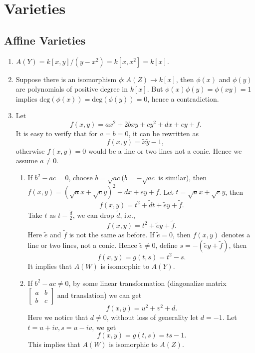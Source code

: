\chapter{Varieties}
\section{Affine Varieties}
\begin{solution}
  \begin{enumerate}
    \item $A(Y)=k[x,y]/(y-x^2)=k[x,x^2]=k[x]$.
    \item Suppose there is an isomorphism $\phi:A(Z)\to k[x]$, then $\phi(x)$ and $\phi\left( y \right) $ are polynomials of positive degree in $k[x]$. But $\phi(x)\phi(y)=\phi(xy)=1$ implies $\mathrm{deg}(\phi(x))=\mathrm{deg}\left( \phi(y) \right) = 0$, hence a contradiction.
    \item Let 
      \[
	f(x,y)=ax^2+2bxy+cy^2+dx+ey+f.
      \] 
      It is easy to verify that for $a=b=0$, it can be rewritten as
       \[
	 f(x,y)=\widetilde{x}\widetilde{y}-1,
      \] 
      otherwise $f(x,y)=0$ would be a line or two lines not a conic. Hence we assume $a\neq 0$.
      \begin{enumerate}
	\item If $b^2-ac=0$, choose $b=\sqrt{ac} $($b=-\sqrt{ac} $ is similar), then $f(x,y)=\left( \sqrt{a} x+\sqrt{c} y \right) ^2+dx+ey+f$. Let $t=\sqrt{a} x+\sqrt{c} y $, then 
	  \[
	    f(x,y)=t^2+\widetilde{d}t+\widetilde{e}y+\widetilde{f}. 
	  \] 
	  Take $t$ as $t-\frac{\widetilde{d}}{2}$, we can drop $\widetilde{d}$, i.e., 
	  \[
	    f(x,y)=t^2+\widetilde{e}y+\widetilde{f}.
	  \] 
	  Here $\widetilde{e}$ and $\widetilde{f}$ is not the same as before. If $\widetilde{e}=0$, then $f(x,y)$ denotes a line or two lines, not a conic. Hence $\widetilde{e}\neq 0$, define $s=-(\widetilde{e}y+\widetilde{f})$, then 
	  \[
	    f(x,y)=g(t,s)=t^2-s.
	  \] 
	  It implies that $A(W)$ is isomorphic to $A(Y)$.
	\item If $b^2-ac\neq 0$, by some linear transformation (diagonalize matrix $\begin{bmatrix} a &b\\b&c \end{bmatrix} $ and translation) we can get 
	  \[
	    f(x,y)=u^2+v^2+d.
	  \] 
	  Here we notice that $d\neq 0$, without loss of generality let  $d=-1$.
Let $t=u+iv,s=u-iv$, we get
 \[
   f(x,y)=g(t,s)=ts-1.
\] 
This implies that $A(W)$ is isomorphic to  $A(Z)$.
      \end{enumerate}
  \end{enumerate}
\end{solution}
